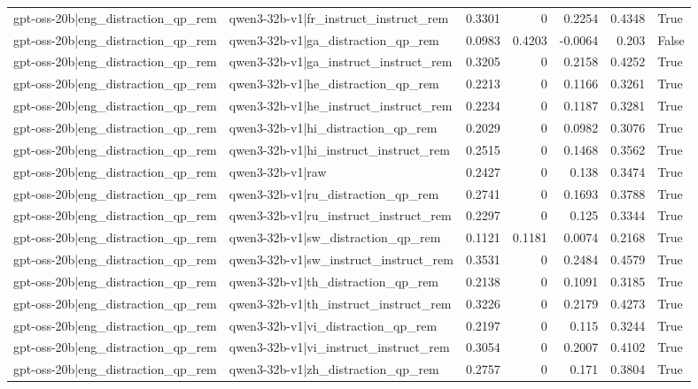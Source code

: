 \begin{table}
\begin{tabular}{l l r r r r l}
gpt-oss-20b|eng_distraction_qp_rem & qwen3-32b-v1|fr_instruct_instruct_rem & 0.3301 & 0 & 0.2254 & 0.4348 & True \\
gpt-oss-20b|eng_distraction_qp_rem & qwen3-32b-v1|ga_distraction_qp_rem & 0.0983 & 0.4203 & -0.0064 & 0.203 & False \\
gpt-oss-20b|eng_distraction_qp_rem & qwen3-32b-v1|ga_instruct_instruct_rem & 0.3205 & 0 & 0.2158 & 0.4252 & True \\
gpt-oss-20b|eng_distraction_qp_rem & qwen3-32b-v1|he_distraction_qp_rem & 0.2213 & 0 & 0.1166 & 0.3261 & True \\
gpt-oss-20b|eng_distraction_qp_rem & qwen3-32b-v1|he_instruct_instruct_rem & 0.2234 & 0 & 0.1187 & 0.3281 & True \\
gpt-oss-20b|eng_distraction_qp_rem & qwen3-32b-v1|hi_distraction_qp_rem & 0.2029 & 0 & 0.0982 & 0.3076 & True \\
gpt-oss-20b|eng_distraction_qp_rem & qwen3-32b-v1|hi_instruct_instruct_rem & 0.2515 & 0 & 0.1468 & 0.3562 & True \\
gpt-oss-20b|eng_distraction_qp_rem & qwen3-32b-v1|raw & 0.2427 & 0 & 0.138 & 0.3474 & True \\
gpt-oss-20b|eng_distraction_qp_rem & qwen3-32b-v1|ru_distraction_qp_rem & 0.2741 & 0 & 0.1693 & 0.3788 & True \\
gpt-oss-20b|eng_distraction_qp_rem & qwen3-32b-v1|ru_instruct_instruct_rem & 0.2297 & 0 & 0.125 & 0.3344 & True \\
gpt-oss-20b|eng_distraction_qp_rem & qwen3-32b-v1|sw_distraction_qp_rem & 0.1121 & 0.1181 & 0.0074 & 0.2168 & True \\
gpt-oss-20b|eng_distraction_qp_rem & qwen3-32b-v1|sw_instruct_instruct_rem & 0.3531 & 0 & 0.2484 & 0.4579 & True \\
gpt-oss-20b|eng_distraction_qp_rem & qwen3-32b-v1|th_distraction_qp_rem & 0.2138 & 0 & 0.1091 & 0.3185 & True \\
gpt-oss-20b|eng_distraction_qp_rem & qwen3-32b-v1|th_instruct_instruct_rem & 0.3226 & 0 & 0.2179 & 0.4273 & True \\
gpt-oss-20b|eng_distraction_qp_rem & qwen3-32b-v1|vi_distraction_qp_rem & 0.2197 & 0 & 0.115 & 0.3244 & True \\
gpt-oss-20b|eng_distraction_qp_rem & qwen3-32b-v1|vi_instruct_instruct_rem & 0.3054 & 0 & 0.2007 & 0.4102 & True \\
gpt-oss-20b|eng_distraction_qp_rem & qwen3-32b-v1|zh_distraction_qp_rem & 0.2757 & 0 & 0.171 & 0.3804 & True \\

\end{tabular}
\end{table}
